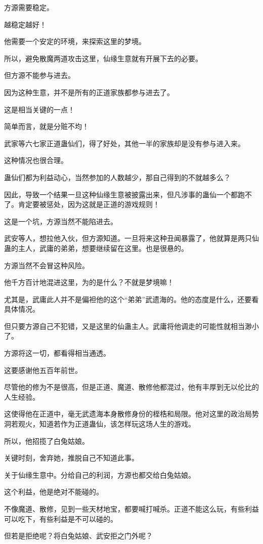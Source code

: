 \begin{this_body}
方源需要稳定。

越稳定越好！

他需要一个安定的环境，来探索这里的梦境。

所以，避免散魔两道攻击这里，仙缘生意就有开展下去的必要。

但方源不能参与进去。

因为这种生意，并不是所有的正道家族都参与进去了。

这是相当关键的一点！

简单而言，就是分赃不均！

武家等六七家正道蛊仙们，得了好处，其他一半的家族却是没有参与进入来。

这种情况也很合理。

蛊仙们都为利益动心，当然参加的人数越少，那自己得到的不就越多么？

因此，导致一个结果一旦这种仙缘生意被披露出来，但凡涉事的蛊仙一个都跑不了。肯定要被惩处，因为这就是正道的游戏规则！

这是一个坑，方源当然不能陷进去。

武安等人，想拉他入伙，但方源知道。一旦将来这种丑闻暴露了，他就算是两只仙蛊的主人，武庸的弟弟，想要继续留在这里。也是很悬的。

方源当然不会冒这种风险。

他千方百计地混进这里，为的是什么？不就是梦境嘛！

尤其是，武庸此人并不是偏袒他的这个“弟弟”武遗海的。他的态度是什么，还要看具体情况。

但只要方源自己不犯错，又是这里的仙蛊主人。武庸将他调走的可能性就相当渺小了。

方源将这一切，都看得相当通透。

这要感谢他五百年前世。

尽管他的修为不是很高，但是正道、魔道、散修他都混过，他有丰厚到无以伦比的人生经验。

这使得他在正道中，毫无武遗海本身散修身份的桎梏和局限。他对这里的政治局势洞若观火，知道若作为正道蛊仙，该怎样玩这场人生的游戏。

所以，他招揽了白兔姑娘。

关键时刻，舍弃她，推脱自己不知道此事。

关于仙缘生意中。分给自己的利润，方源也都交给白兔姑娘。

这个利益，他是绝对不能碰的。

不像魔道、散修，见到一些天材地宝，都要喊打喊杀。正道不能这么玩，有些利益可以吃下，有些利益是不可以碰的。

但若是拒绝呢？将白兔姑娘、武安拒之门外呢？


\end{this_body}
